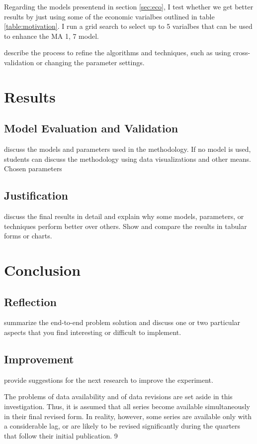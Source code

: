 \documentclass[12pt]{article}
\begin{document}
Regarding the models presentend in section \ref{sec:eco}, I test whether we get better results by just using some of the economic varialbes outlined in table \ref{table:motivation}. I run a grid search to select up to 5 varialbes that can be used to enhance the MA 1, 7 model. 



describe the process to refine the algorithms and techniques, such as using cross-validation or changing the parameter settings.

\section{Results}
\subsection{Model Evaluation and Validation}
discuss the models and parameters used in the methodology. If no model is used, students can discuss the methodology using data visualizations and other means.
Chosen parameters


\subsection{Justification}
 discuss the final results in detail and explain why some models, parameters, or techniques perform better over others. Show and compare the results in tabular forms or charts.

\section{Conclusion}
\subsection{Reflection}
 summarize the end-to-end problem solution and discuss one or two particular aspects that you find interesting or difficult to implement.
\subsection{Improvement}
 provide suggestions for the next research to improve the experiment.

The problems of data availability and of data revisions are set aside in this investigation.
Thus, it is assumed that all series become available simultaneously in their final revised form.
In reality, however, some series are available only with a considerable lag, or are likely to be
revised significantly during the quarters that follow their initial publication. 9
\end{document}
